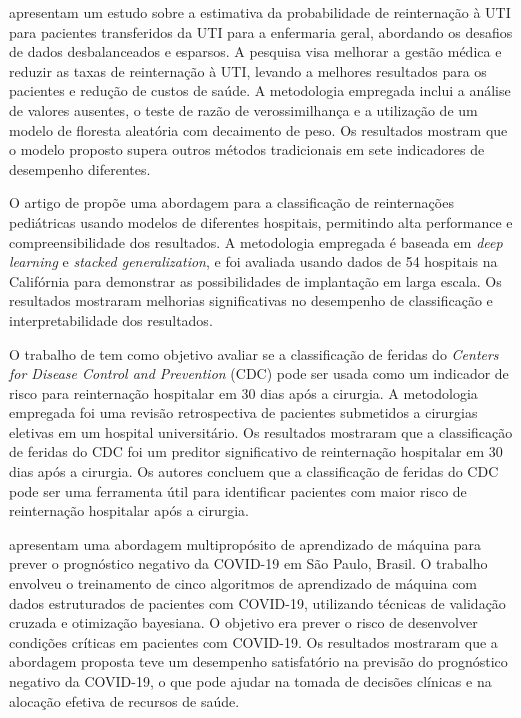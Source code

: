  apresentam um estudo sobre a estimativa da probabilidade de reinternação à UTI para pacientes transferidos da UTI para a enfermaria geral, abordando os desafios de dados desbalanceados e esparsos. A pesquisa visa melhorar a gestão médica e reduzir as taxas de reinternação à UTI, levando a melhores resultados para os pacientes e redução de custos de saúde. A metodologia empregada inclui a análise de valores ausentes, o teste de razão de verossimilhança e a utilização de um modelo de floresta aleatória com decaimento de peso. Os resultados mostram que o modelo proposto supera outros métodos tradicionais em sete indicadores de desempenho diferentes.

O artigo de  propõe uma abordagem para a classificação de reinternações pediátricas usando modelos de diferentes hospitais, permitindo alta performance e compreensibilidade dos resultados. A metodologia empregada é baseada em \textit{deep learning} e \textit{stacked generalization}, e foi avaliada usando dados de 54 hospitais na Califórnia para demonstrar as possibilidades de implantação em larga escala. Os resultados mostraram melhorias significativas no desempenho de classificação e interpretabilidade dos resultados.

O trabalho de  tem como objetivo avaliar se a classificação de feridas do \textit{Centers for Disease Control and Prevention} (CDC) pode ser usada como um indicador de risco para reinternação hospitalar em 30 dias após a cirurgia. A metodologia empregada foi uma revisão retrospectiva de pacientes submetidos a cirurgias eletivas em um hospital universitário. Os resultados mostraram que a classificação de feridas do CDC foi um preditor significativo de reinternação hospitalar em 30 dias após a cirurgia. Os autores concluem que a classificação de feridas do CDC pode ser uma ferramenta útil para identificar pacientes com maior risco de reinternação hospitalar após a cirurgia.

 apresentam uma abordagem multipropósito de aprendizado de máquina para prever o prognóstico negativo da COVID-19 em São Paulo, Brasil. O trabalho envolveu o treinamento de cinco algoritmos de aprendizado de máquina com dados estruturados de pacientes com COVID-19, utilizando técnicas de validação cruzada e otimização bayesiana. O objetivo era prever o risco de desenvolver condições críticas em pacientes com COVID-19. Os resultados mostraram que a abordagem proposta teve um desempenho satisfatório na previsão do prognóstico negativo da COVID-19, o que pode ajudar na tomada de decisões clínicas e na alocação efetiva de recursos de saúde.

